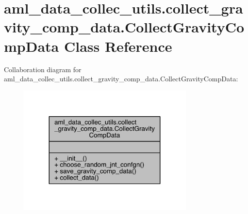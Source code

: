 \hypertarget{classaml__data__collec__utils_1_1collect__gravity__comp__data_1_1_collect_gravity_comp_data}{}\section{aml\+\_\+data\+\_\+collec\+\_\+utils.\+collect\+\_\+gravity\+\_\+comp\+\_\+data.\+Collect\+Gravity\+Comp\+Data Class Reference}
\label{classaml__data__collec__utils_1_1collect__gravity__comp__data_1_1_collect_gravity_comp_data}


Collaboration diagram for aml\+\_\+data\+\_\+collec\+\_\+utils.\+collect\+\_\+gravity\+\_\+comp\+\_\+data.\+Collect\+Gravity\+Comp\+Data\+:\nopagebreak
\begin{figure}[H]
\begin{center}
\leavevmode
\includegraphics[width=251pt]{classaml__data__collec__utils_1_1collect__gravity__comp__data_1_1_collect_gravity_comp_data__coll__graph}
\end{center}
\end{figure}
